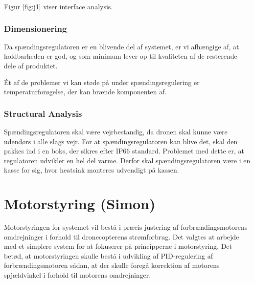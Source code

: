 Figur \ref{fig:j1} viser interface analysis.

\subsubsection{Dimensionering}
\label{sec:generel-analyse-1}

Da spændingsregulatoren er en blivende del af systemet, er vi afhængige af, at holdbarheden er god, og som minimum lever op til kvaliteten af de resterende dele af produktet.

Ét af de problemer vi kan støde på under spændingsregulering er temperaturforøgelse, der kan brænde komponenten af.

\subsubsection{Structural Analysis}
\label{sec:generel-analyse-2}

Spændingsregulatoren skal være vejrbestandig, da dronen skal kunne være udendørs i alle slags vejr. For at spændingsregulatoren kan blive det, skal den pakkes ind i en boks, der sikres efter IP66 standard. Problemet med dette er, at regulatoren udvikler en hel del varme. Derfor skal spændingsregulatoren være i en kasse for sig, hvor heatsink monteres udvendigt på kassen.

\section{Motorstyring (Simon)}
\label{sec:motorstyring}

Motorstyringen for systemet vil bestå i præcis justering af forbrændingsmotorens omdrejninger i forhold til dronecopterens strømforbrug. Det valgtes at arbejde med et simplere system for at fokuserer på principperne i motorstyring. Det betød, at motorstyringen skulle bestå i udvikling af PID-regulering af forbrændingsmotoren sådan, at der skulle foregå korrektion af motorens spjældvinkel i forhold til motorens omdrejninger.



